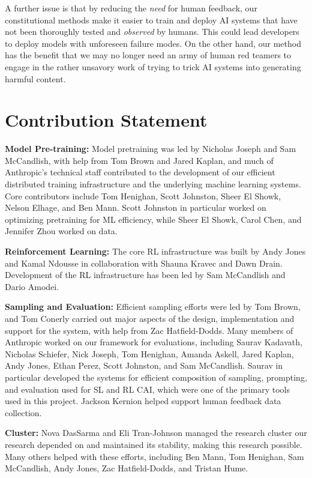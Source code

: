 \documentclass[english]{article}
\renewcommand\>{\rangle}
\begin{document}
A further issue is that by reducing the \emph{need} for human feedback, our constitutional methods make it easier to train and deploy AI systems that have not been thoroughly tested and \emph{observed} by humans.   This could lead developers to deploy models with unforeseen failure modes. On the other hand, our method has the benefit that we may no longer need an army of human red teamers to engage in the rather unsavory work of trying to trick AI systems into generating harmful content.  



\section{Contribution Statement}
\label{sec:ContributionStatement}



{\bf Model Pre-training:} Model pretraining was led by  Nicholas Joseph and Sam McCandlish, with help from Tom Brown and Jared Kaplan, and much of Anthropic's technical staff contributed to the development of our efficient distributed training infrastructure and the underlying machine learning systems. Core contributors include Tom Henighan, Scott Johnston, Sheer El Showk, Nelson Elhage, and Ben Mann. Scott Johnston in particular worked on optimizing pretraining for ML efficiency, while Sheer El Showk, Carol Chen, and Jennifer Zhou worked on data.

{\bf Reinforcement Learning:} The core RL infrastructure was built by Andy Jones and Kamal Ndousse in collaboration with Shauna Kravec and Dawn Drain. Development of the RL infrastructure has been led by Sam McCandlish and Dario Amodei.

{\bf Sampling and Evaluation:} Efficient sampling efforts were led by Tom Brown, and Tom Conerly carried out major aspects of the design, implementation and support for the system, with help from Zac Hatfield-Dodds. Many members of Anthropic worked on our framework for evaluations, including Saurav Kadavath, Nicholas Schiefer, Nick Joseph, Tom Henighan, Amanda Askell, Jared Kaplan, Andy Jones, Ethan Perez, Scott Johnston, and Sam McCandlish. Saurav in particular developed the systems for efficient composition of sampling, prompting, and evaluation used for SL and RL CAI, which were one of the primary tools used in this project. Jackson Kernion helped support human feedback data collection.

{\bf Cluster:} Nova DasSarma and Eli Tran-Johnson managed the research cluster our research depended on and maintained its stability, making this research possible. Many others helped with these efforts, including Ben Mann, Tom Henighan, Sam McCandlish, Andy Jones, Zac Hatfield-Dodds, and Tristan Hume.
\end{document}
